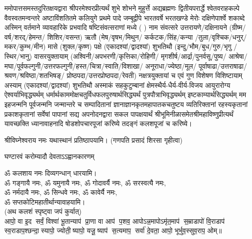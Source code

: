 
ममोपात्तसमस्तदुरितक्षयद्वारा श्रीपरमेश्वरप्रीत्यर्थं शुभे शोभने मुहुर्त्ते अद्यब्रह्मणः
द्वितीयपरार्द्धे श्वेतवराहकल्पे वैवस्वतमन्वन्तरे अष्टाविंशतितमे कलियुगे प्रथमे पादे
जम्बूद्वीपे भारतवर्षे भरतखण्डे मेरोः दक्षिणेपार्श्वे शकाब्दे अस्मिन् वर्तमाने व्यावहारिके
 प्रभवादि षष्टिसंवत्सराणां मध्ये (	) नाम संवत्सरे उत्तरायणे/दक्षिनायने 
(ग्रीष्म/वर्ष/शरद्/हेमन्त/ शिशिर/वसन्त) ऋतौ  (मेष/वृषभ/मिथुन/
कर्कटक/सिंह/कन्या /तुला/वृश्चिक/धनुर्/मकर/कुम्भ/मीन) मासे 
(शुक्ल/कृष्ण) पक्षे (एकादश्यां/द्वादश्यां) शुभतिथौ
(इन्दु/भौम/बुध/गुरु/भृगु /स्थिर/भानु) वासरयुक्तायाम्
(अश्विनी/अपभरणी/कृत्तिका/रोहिणी/ मृगशीर्ष/आर्द्रा/पुनर्वसू/पुष्य/
आश्रेषा/मघा/पूर्वफल्गुनी/उत्तर\-फल्गुनी/हस्त/चित्रा/स्वाति/विशाखा/
अनूराधा/ज्येष्ठा/मूल/ पूर्वाषाढा/उत्तराषाढा/श्रवण/श्रविष्ठा/शतभिषङ्/
प्रोष्ठपदा/उत्तर\-प्रोष्ठपदा/रेवती) नक्षत्रयुक्तायां च एवं गुण विशेषण विशिष्टायाम्
अस्याम् (एकादश्यां/द्वादश्यां) शुभतिथौ 
अस्माकं सहकुटुम्बानां क्षेमस्थैर्य-धैर्य-वीर्य-विजय आयुरारोग्य ऐश्वर्याभिवृद्ध्यर्थम्
 धर्मार्थकाममोक्ष\-चतुर्विधफलपुरुषार्थसिद्ध्यर्थं पुत्रपौत्राभिवृद्ध्यर्थम् इष्टकाम्यार्थसिद्ध्यर्थम्
मम इहजन्मनि पूर्वजन्मनि जन्मान्तरे च सम्पादितानां ज्ञानाज्ञानकृतमहा\-पातकचतुष्टय
व्यतिरिक्तानां रहस्यकृतानां प्रकाशकृतानां सर्वेषां पापानां सद्य अपनोदनद्वारा सकल 
पापक्षयार्थं श्रीभूमिनीळासमेतश्रीमहाविष्णुप्रीत्यर्थं यावच्छक्ति ध्यानावाहनादि 
षोडशोपचारपूजां करिष्ये तदङ्गं कलशपूजां च करिष्ये।


श्रीविघ्नेश्वराय नमः यथास्थानं प्रतिष्ठापयामि।
(गणपति प्रसादं शिरसा गृहीत्वा)


{घण्टारवं करोम्यादौ देवताऽऽह्वानकारणम्}

ॐ कलशाय नमः दिव्यगन्धान् धारयामि।\\
ॐ गङ्गायै नमः, ॐ यमुनायै नमः, ॐ गोदावर्यै नमः,  ॐ सरस्वत्यै नमः,\\ ॐ नर्मदायै नमः, ॐ सिन्धवे नमः, ॐ कावेर्यै नमः,\\
 ॐ सप्तकोटिमहातीर्थान्यावाहयामि। \\

(अथ कलशं स्पृष्ट्वा जपं कुर्यात्) \\
आपो॒ वा इ॒द सर्वं॒ विश्वा॑ भू॒तान्याप॑ प्रा॒णा वा आप॑ प॒शव॒ आपोऽन्न॒मापोऽमृ॑त॒माप॑ स॒म्राडापो॑ वि॒राडाप॑ स्व॒राडाप॒श्छन्दा॒स्यापो॒ ज्योती॒ष्यापो॒ यजू॒ष्याप॑ स॒त्यमाप॒ सर्वा॑ दे॒वता॒ आपो॒ भूर्भुव॒स्सुव॒राप॒ ओम्॥\\
 
